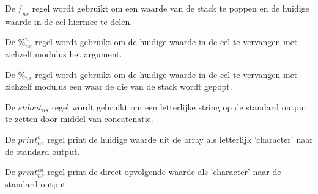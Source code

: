 \documentclass[11pt]{article}
\begin{document}
De $/_{ns}$ regel wordt gebruikt om een waarde van de stack te poppen en de huidige waarde in de cel hiermee te delen.
\begin{prooftree}
\end{prooftree}

De $\%^n_{ns}$ regel wordt gebruikt om de huidige waarde in de cel te vervangen met zichzelf modulus het argument.
\begin{prooftree}
\end{prooftree}

De $\%_{ns}$ regel wordt gebruikt om de huidige waarde in de cel te vervangen met zichzelf modulus een waar de die van de stack wordt gepopt.
\begin{prooftree}
\end{prooftree}



De $stdout_{ns}$ regel wordt gebruikt om een letterlijke string op de standard output te zetten door middel van concatenatie.
\begin{prooftree}
\end{prooftree}


De $print^c_{ns}$ regel print de huidige waarde uit de array als letterlijk 'character' naar de standard output.
\begin{prooftree}
\end{prooftree}

De $print^{cn}_{ns}$ regel print de direct opvolgende waarde als 'character' naar de standard output.
\begin{prooftree}
\end{prooftree}
\end{document}
